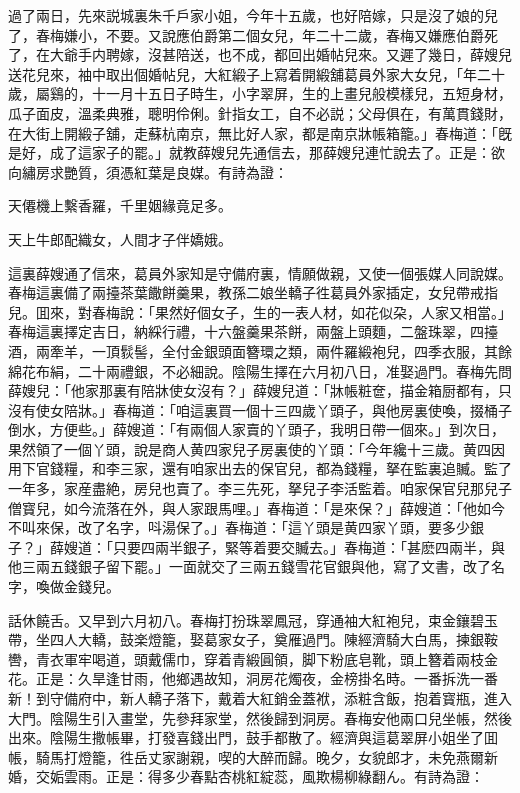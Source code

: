 過了兩日，先來説城裏朱千戶家小姐，今年十五歲，也好陪嫁，只是沒了娘的兒了，春梅嫌小，不要。又說應伯爵第二個女兒，年二十二歲，春梅又嫌應伯爵死了，在大爺手内聘嫁，沒甚陪送，也不成，都回出婚帖兒來。又遲了幾日，薛嫂兒送花兒來，袖中取出個婚帖兒，大紅緞子上寫着開緞舖葛員外家大女兒，「年二十歲，屬鷄的，十一月十五日子時生，小字翠屏，生的上畫兒般模樣兒，五短身材，瓜子面皮，溫柔典雅，聰明伶俐。針指女工，自不必説；父母俱在，有萬貫錢財，在大街上開緞子舖，走蘇杭南京，無比好人家，都是南京牀帳箱籠。」春梅道：「旣是好，成了這家子的罷。」就教薛嫂兒先通信去，那薛嫂兒連忙說去了。正是：欲向繡房求艷質，須憑紅葉是良媒。有詩為證：

\begin{myquote}
天僊機上繫香羅，千里姻緣竟足多。

天上牛郎配織女，人間才子伴嬌娥。
\end{myquote}

這裏薛嫂通了信來，葛員外家知是守備府裏，情願做親，又使一個張媒人同說媒。春梅這裏備了兩擡茶葉饊餅羹果，教孫二娘坐轎子徃葛員外家插定，女兒帶戒指兒。囬來，對春梅說：「果然好個女子，生的一表人材，如花似朶，人家又相當。」春梅這裏擇定吉日，納綵行禮，十六盤羹果茶餅，兩盤上頭麵，二盤珠翠，四擡酒，兩牽羊，一頂䯼髻，全付金銀頭面簪環之類，兩件羅緞袍兒，四季衣服，其餘綿花布絹，二十兩禮銀，不必細說。陰陽生擇在六月初八日，准娶過門。春梅先問薛嫂兒：「他家那裏有陪牀使女沒有？」薛嫂兒道：「牀帳粧奩，描金箱厨都有，只沒有使女陪牀。」春梅道：「咱這裏買一個十三四歲丫頭子，與他房裏使喚，掇桶子倒水，方便些。」薛嫂道：「有兩個人家賣的丫頭子，我明日帶一個來。」到次日，果然領了一個丫頭，說是商人黄四家兒子房裏使的丫頭：「今年纔十三歲。黄四因用下官錢糧，和李三家，還有咱家出去的保官兒，都為錢糧，拏在監裏追贓。監了一年多，家産盡絶，房兒也賣了。李三先死，拏兒子李活監着。咱家保官兒那兒子僧寳兒，如今流落在外，與人家跟馬哩。」春梅道：「是來保？」薛嫂道：「他如今不叫來保，改了名字，呌湯保了。」春梅道：「這丫頭是黄四家丫頭，要多少銀子？」薛嫂道：「只要四兩半銀子，緊等着要交贓去。」春梅道：「甚麽四兩半，與他三兩五錢銀子留下罷。」一面就交了三兩五錢雪花官銀與他，寫了文書，改了名字，喚做金錢兒。

話休饒舌。又早到六月初八。春梅打扮珠翠鳳冠，穿通袖大紅袍兒，束金鑲碧玉帶，坐四人大轎，鼓楽燈籠，娶葛家女子，奠雁過門。陳經濟騎大白馬，揀銀鞍轡，青衣軍牢喝道，頭戴儒巾，穿着青緞圓領，脚下粉底皂靴，頭上簪着兩枝金花。正是：久旱逢甘雨，他鄉遇故知，洞房花燭夜，金榜掛名時。一番拆洗一番新！到守備府中，新人轎子落下，戴着大紅銷金蓋袱，添粧含飯，抱着寳瓶，進入大門。陰陽生引入畫堂，先參拜家堂，然後歸到洞房。春梅安他兩口兒坐帳，然後出來。陰陽生撒帳畢，打發喜錢出門，鼓手都散了。經濟與這葛翠屏小姐坐了囬帳，騎馬打燈籠，徃岳丈家謝親，喫的大醉而歸。晚夕，女貌郎才，未免燕爾新婚，交姤雲雨。正是：得多少春點杏桃紅綻蕊，風欺楊柳綠翻ん。有詩為證：

